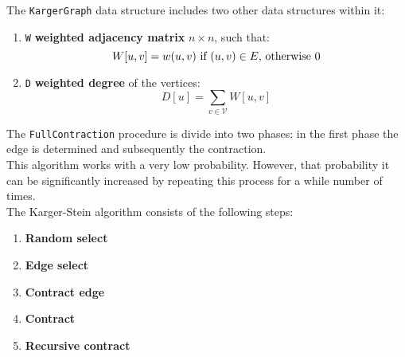 The \verb|KargerGraph| data structure includes two other data structures within it:
\begin{enumerate}
    \item \verb|W| \textbf{weighted adjacency matrix} $n \times n$, such that: 
    \[
        W[u,v] = w(u,v) \textnormal{ if } (u,v) \in E \textnormal{, otherwise } 0
    \]
    \item \verb|D| \textbf{weighted degree} of the vertices:
    \[
        D[u] = \sum_{v \in \mathcal{V}} W[u,v]
    \]
\end{enumerate}
\noindent
The \verb|FullContraction| procedure is divide into two phases: in the first phase the edge is determined and subsequently the contraction.\\ 
This algorithm works with a very low probability. However, that probability it can be significantly increased by repeating this process for a while number of times.\\
\noindent The Karger-Stein algorithm consists of the following steps:
\begin{enumerate}
    \item \textbf{Random select}
    \item \textbf{Edge select}
    \item \textbf{Contract edge}
    \item \textbf{Contract}
    \item \textbf{Recursive contract}
\end{enumerate}

